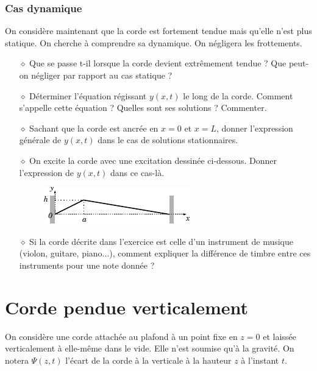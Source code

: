 \documentclass{report}
\begin{document}
\subsubsection*{Cas dynamique}

On considère maintenant que la corde est fortement tendue mais qu'elle n'est plus statique. On cherche à comprendre sa dynamique. On négligera les frottements.

\begin{itemize}

	\item[$\diamond$] Que se passe t-il lorsque la corde devient extrêmement tendue ? Que peut-on négliger par rapport au cas statique ?

	\item[$\diamond$] Déterminer l'équation régissant $y(x,t)$ le long de la corde. Comment s'appelle cette équation ? Quelles sont ses solutions ? Commenter.
	
	\item[$\diamond$] Sachant que la corde est ancrée en $x=0$ et $x=L$, donner l'expression générale de $y(x,t)$ dans le cas de solutions stationnaires. 
	
	\item[$\diamond$] On excite la corde avec une excitation dessinée ci-dessous. Donner l'expression de $y(x,t)$ dans ce cas-là.
	
	\begin{figure}[h!]
	\centering
		\includegraphics[scale=1.5]{onde2.pdf}
	\end{figure}

	\item[$\diamond$] Si la corde décrite dans l'exercice est celle d'un instrument de musique (violon, guitare, piano...), comment expliquer la différence de timbre entre ces instruments pour une note donnée ?
	
\end{itemize}

\newpage

\section*{Corde pendue verticalement}

On considère une corde attachée au plafond à un point fixe en $z=0$ et laissée verticalement à elle-même dans le vide. Elle n'est soumise qu'à la gravité. On notera $\Psi(z,t)$ l'écart de la corde à la verticale à la hauteur $z$ à l'instant $t$.
\end{document}
